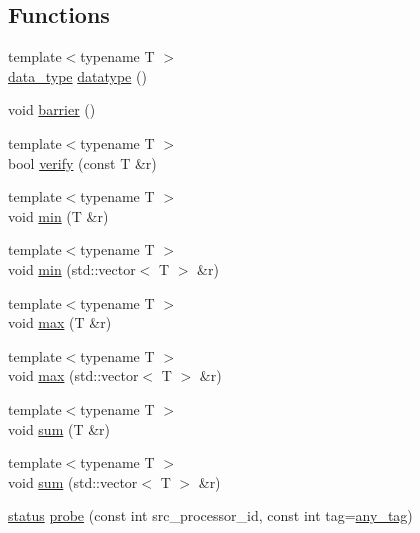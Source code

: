 \subsection*{Functions}
\begin{DoxyCompactItemize}
\item 
{\footnotesize template$<$typename T $>$ }\\\mbox{\hyperlink{structfemus_1_1_parallel_1_1data__type}{data\+\_\+type}} \mbox{\hyperlink{namespacefemus_1_1_parallel_a02155e648a68195486e46feabd0f2ec0}{datatype}} ()
\item 
void \mbox{\hyperlink{namespacefemus_1_1_parallel_a92f3377fb5ef4195c1db50a79b051c02}{barrier}} ()
\item 
{\footnotesize template$<$typename T $>$ }\\bool \mbox{\hyperlink{namespacefemus_1_1_parallel_a228cad24a8dc0968b965c0986428ad4a}{verify}} (const T \&r)
\item 
{\footnotesize template$<$typename T $>$ }\\void \mbox{\hyperlink{namespacefemus_1_1_parallel_a63e5f0fd22309cacacb73e7dfd3256df}{min}} (T \&r)
\item 
{\footnotesize template$<$typename T $>$ }\\void \mbox{\hyperlink{namespacefemus_1_1_parallel_adb06087f16bb1136a2c2c1465f07fbcd}{min}} (std\+::vector$<$ T $>$ \&r)
\item 
{\footnotesize template$<$typename T $>$ }\\void \mbox{\hyperlink{namespacefemus_1_1_parallel_af18000527efd43ab82a8734b3c6d91f1}{max}} (T \&r)
\item 
{\footnotesize template$<$typename T $>$ }\\void \mbox{\hyperlink{namespacefemus_1_1_parallel_ae4d2a186c227f0dfd057767cbd158a7f}{max}} (std\+::vector$<$ T $>$ \&r)
\item 
{\footnotesize template$<$typename T $>$ }\\void \mbox{\hyperlink{namespacefemus_1_1_parallel_a17c680b5adf174b6185a5aeea86e5188}{sum}} (T \&r)
\item 
{\footnotesize template$<$typename T $>$ }\\void \mbox{\hyperlink{namespacefemus_1_1_parallel_a5e5e9ec906f929468e0cf17dcc7e3f4c}{sum}} (std\+::vector$<$ T $>$ \&r)
\item 
\mbox{\hyperlink{structfemus_1_1_parallel_1_1status}{status}} \mbox{\hyperlink{namespacefemus_1_1_parallel_a3799e1e93384e926d91a6cba47d61bb2}{probe}} (const int src\+\_\+processor\+\_\+id, const int tag=\mbox{\hyperlink{namespacefemus_1_1_parallel_a928996065f46cb52e89e132cdcb30328}{any\+\_\+tag}})

\end{DoxyCompactItemize}
